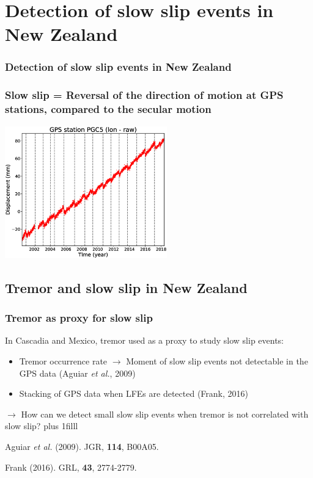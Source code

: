 \documentclass{beamer}
\newcommand{\btVFill}{\vskip0pt plus 1filll}
\begin{document}
	\section{Detection of slow slip events in New Zealand}

	\begin{frame}
		\frametitle{Detection of slow slip events in New Zealand}
	\end{frame}

	\begin{frame}
		\frametitle{Slow slip = Reversal of the direction of motion at GPS stations, compared to the secular motion}
		\begin{center}
			\includegraphics[trim={0cm 0cm 0cm 0cm}, clip, width=7cm]{slowslip/slow_slip_GPS.eps}
		\end{center}
	\end{frame}


	\subsection{Tremor and slow slip in New Zealand}

	\begin{frame}
		\frametitle{Tremor as proxy for slow slip}

		\vspace{3em}

		In Cascadia and Mexico, tremor used as a proxy to study slow slip events:
		\begin{itemize}
			\item Tremor occurrence rate $\rightarrow$ Moment of slow slip events not detectable in the GPS data (Aguiar \textit{et al.}, 2009)
			\item Stacking of GPS data when LFEs are detected (Frank, 2016)
		\end{itemize}
		$\rightarrow$ How can we detect small slow slip events when tremor is not correlated with slow slip?
		\btVFill
		\tiny{Aguiar \textit{et al.} (2009). JGR, \textbf{114}, B00A05.

		Frank (2016). GRL, \textbf{43}, 2774-2779.}
	\end{frame}
		
\end{document}
